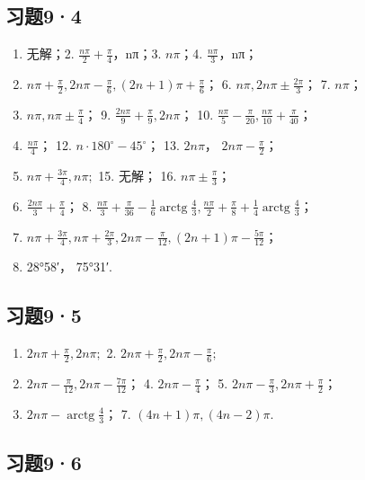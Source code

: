 \subsection{习题9·4}

\begin{enumerate}
\item
  无解；2. \(\frac{n\pi}{2}+\frac{\pi}{4}\)，nπ；3. \(n\pi\)；4.
  \(\frac{n\pi}{3}\)，nπ；
\item
  \(n\pi + \frac{\pi}{2}, 2n\pi - \frac{\pi}{6}, (2n + 1)\pi + \frac{\pi}{6}\)；
  6. \(n\pi, 2n\pi \pm \frac{2\pi}{3}\)； 7. \(n\pi\)；
\item
  \(n\pi, n\pi \pm \frac{\pi}{4}\)； 9.
  \(\frac{2n\pi}{9} + \frac{\pi}{9}, 2n\pi\)； 10.
  \(\frac{n\pi}{5} - \frac{\pi}{20}, \frac{n\pi}{10} + \frac{\pi}{40}\)；
\item
  \(\frac{n\pi}{4}\)； 12. \(n\cdot180^{\circ}-45^{\circ}\)； 13.
  \(2n\pi\)， \(2n\pi-\frac{\pi}{2}\)；
\item
  \(n\pi + \frac{3\pi}{4}, n\pi;\) 15. 无解； 16.
  \(n\pi \pm \frac{\pi}{3}\)；
\item
  \(\frac{2n\pi}{3} + \frac{\pi}{4}\)； 8.
  \(\frac{n\pi}{3} + \frac{\pi}{36} - \frac{1}{6} \operatorname{arctg} \frac{4}{3}, \frac{n\pi}{2} + \frac{\pi}{8} + \frac{1}{4} \operatorname{arctg} \frac{4}{3}\)；
\item
  \(n\pi + \frac{3\pi}{4}, n\pi + \frac{2\pi}{3}, 2n\pi - \frac{\pi}{12}, (2n + 1)\pi - \frac{5\pi}{12}\)；
\item
  28°58′， 75°31′.
\end{enumerate}

\subsection{习题9·5}

\begin{enumerate}
\item
  \(2n\pi + \frac{\pi}{2}, 2n\pi;\) 2.
  \(2n\pi + \frac{\pi}{2}, 2n\pi - \frac{\pi}{6};\)
\item
  \(2n\pi - \frac{\pi}{12}, 2n\pi - \frac{7\pi}{12}\)； 4.
  \(2n\pi - \frac{\pi}{4}\)； 5.
  \(2n\pi - \frac{\pi}{3}, 2n\pi + \frac{\pi}{2}\)；
\item
  \(2n\pi - \operatorname{arctg} \frac{4}{3}\)； 7.
  \((4n + 1)\pi, (4n - 2)\pi\).
\end{enumerate}

\subsection{习题9·6}

